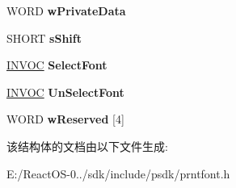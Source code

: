\begin{DoxyCompactItemize}
W\+O\+RD {\bfseries w\+Private\+Data}
\item 
\mbox{\label{struct___u_n_i_d_r_v_i_n_f_o_a51b71a8f39df25997749307053edc17c}} 
S\+H\+O\+RT {\bfseries s\+Shift}
\item 
\mbox{\label{struct___u_n_i_d_r_v_i_n_f_o_ab55d773b7bc7419c741cc4b2d3c51b61}} 
\hyperlink{struct___i_n_v_o_c}{I\+N\+V\+OC} {\bfseries Select\+Font}
\item 
\mbox{\label{struct___u_n_i_d_r_v_i_n_f_o_a0534d39deed6fb4441a5579dff7e112a}} 
\hyperlink{struct___i_n_v_o_c}{I\+N\+V\+OC} {\bfseries Un\+Select\+Font}
\item 
\mbox{\label{struct___u_n_i_d_r_v_i_n_f_o_a9a7fb1b5d4208e8e57bfe291a4bcd53e}} 
W\+O\+RD {\bfseries w\+Reserved} \mbox{[}4\mbox{]}
\end{DoxyCompactItemize}


该结构体的文档由以下文件生成\+:\begin{DoxyCompactItemize}
\item 
E\+:/\+React\+O\+S-\/0../sdk/include/psdk/prntfont.\+h\end{DoxyCompactItemize}
